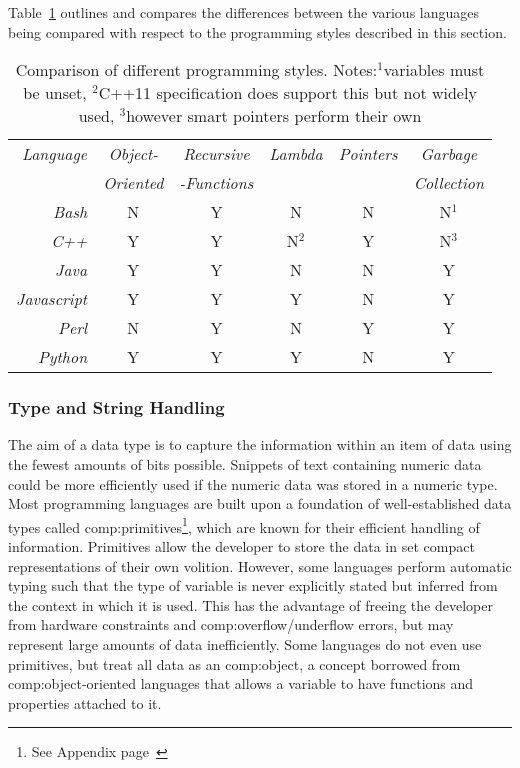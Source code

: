 Table~\ref{table:haplo:complang} outlines and compares the differences between the various languages being compared with respect to the programming styles described in this section.

\begin{table}[h]
\begin{center}
\begin{tabular}{ r c c c c c } \toprule
\emph{Language} & \emph{Object-} & \emph{Recursive} & \emph{Lambda} & \emph{Pointers} & \emph{Garbage} \\
& \emph{Oriented} & \emph{-Functions} & & & \emph{Collection} \\
\midrule
\textit{Bash} & N & Y & N & N & N$^1$ \\
\textit{C++} &  Y & Y & N$^2$ & Y & N$^3$ \\
\textit{Java} & Y & Y & N & N & Y \\
\textit{Javascript} & Y & Y & Y & N & Y \\
\textit{Perl} & N & Y & N & Y & Y \\
\textit{Python} & Y & Y & Y & N & Y \\ \bottomrule
\hline
\end{tabular}
\end{center}
\caption[Comparison of different programming styles]{Comparison of different programming styles. Notes:$^1$variables must be unset, $^2$C++11 specification does support this but not widely used, $^3$however smart pointers  perform their own\citep{embedded1999embedded}}\label{table:haplo:complang}
\end{table}


\subsubsection{Type and String Handling}

The aim of a data type is to capture the information within an item of data using the fewest amounts of bits possible. Snippets of text containing numeric data could be more efficiently used if the numeric data was stored in a numeric type.  Most programming languages are built upon a foundation of  well-established data types called \gls{comp:primitives}\footnote{See Appendix page~\pageref{ref:app:primitives}}, which are known for their efficient handling of information. Primitives allow the developer to store the data in set compact representations of their own volition. However, some languages perform automatic typing such that the type of variable is never explicitly stated but inferred from the context in which it is used. This has the advantage of freeing the developer from hardware constraints and \gls{comp:overflow/underflow} errors, but may represent large amounts of data inefficiently. Some languages do not even use primitives, but treat all data as an \gls{comp:object}, a concept borrowed from \gls{comp:object-oriented} languages  that allows a variable to have functions and properties attached to it.

